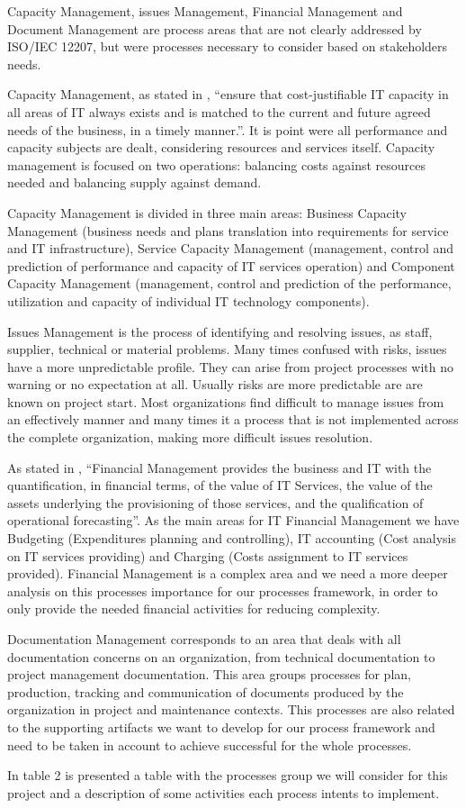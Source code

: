 Capacity Management, issues Management, Financial Management and Document Management are process areas that are not clearly addressed by ISO/IEC 12207, but were processes necessary to consider based on stakeholders needs.\par
Capacity Management, as stated in \cite{itilSD}, ``ensure that cost-justifiable IT capacity in all areas of IT always exists and is matched to the current and future agreed needs of the business, in a timely manner.''. It is point were all performance and capacity subjects are dealt, considering resources and services itself. Capacity management is focused on two operations: balancing costs against resources needed and balancing supply against demand.\par
Capacity Management is divided in three main areas: Business Capacity Management (business needs and plans translation into requirements for service and IT infrastructure), Service Capacity Management (management, control and prediction of performance and capacity of IT services operation) and Component Capacity Management (management, control and prediction of the performance, utilization and capacity of individual IT technology components).\par
Issues Management is the process of identifying and resolving issues, as staff, supplier, technical or material problems. Many times confused with risks, issues have a more unpredictable profile. They can arise from project processes with no warning or no expectation at all. Usually risks are more predictable are are known on project start. Most organizations find difficult to manage issues from an effectively manner and many times it a process that is not implemented across the complete organization, making more difficult issues resolution.\par
As stated in \cite{itilSS}, ``Financial Management provides the business and IT with the quantification, in financial terms, of the value of IT Services, the value of the assets underlying the provisioning of those services, and the qualification of operational forecasting''. As the main areas for IT Financial Management we have Budgeting (Expenditures planning and controlling), IT accounting (Cost analysis on IT services providing) and Charging (Costs assignment to IT services provided). Financial Management is a complex area and we need a more deeper analysis on this processes importance for our processes framework, in order to only provide the needed financial activities for reducing complexity.\par
Documentation Management corresponds to an area that deals with all documentation concerns on an organization, from technical documentation to project management documentation. This area groups processes for plan, production, tracking and communication of documents produced by the organization in project and maintenance contexts. This processes are also related to the supporting artifacts we want to develop for our process framework and need to be taken in account to achieve successful for the whole processes.\par
In table 2 is presented a table with the processes group we will consider for this project and a description of some activities each process intents to implement.

